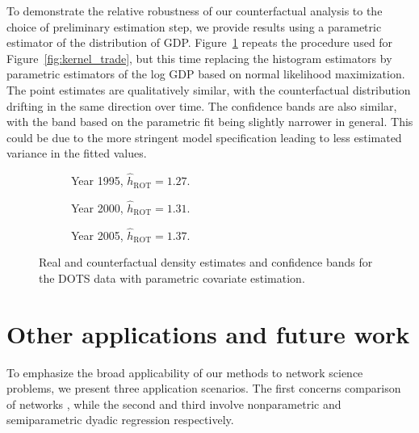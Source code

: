 \documentclass[11pt,lof]{puthesis}
\DeclareMathOperator{\ROT}{ROT}
\theoremstyle{break}
\theoremstyle{proof}
\begin{document}
To demonstrate the relative robustness of our counterfactual analysis to the
choice of preliminary estimation step, we provide results using a
parametric estimator of the distribution of GDP.
Figure~\ref{fig:kernel_trade_para}
repeats the procedure used for Figure~\ref{fig:kernel_trade}, but this time
replacing
the histogram estimators by parametric estimators of the log GDP based on
normal likelihood maximization. The point estimates are qualitatively similar,
with the counterfactual distribution drifting in the same direction over time.
The confidence bands are also similar, with the band based on the parametric
fit being slightly narrower in general. This could be due to the more stringent
model specification leading to less estimated variance in the fitted values.

\begin{figure}[t]
  \centering
  \begin{subfigure}{0.32\textwidth}
    \centering
    \caption{Year 1995, $\hat h_{\ROT} = 1.27$.}
  \end{subfigure}
  \begin{subfigure}{0.32\textwidth}
    \centering
    \caption{Year 2000, $\hat h_{\ROT} = 1.31$.}
  \end{subfigure}
  \begin{subfigure}{0.32\textwidth}
    \centering
    \caption{Year 2005, $\hat h_{\ROT} = 1.37$.}
  \end{subfigure}
  \caption[Parametric likelihood-based estimation and
  inference for the DOTS data]{
    Real and counterfactual density estimates and confidence bands for
  the DOTS data with parametric covariate estimation.}
  \label{fig:kernel_trade_para}
\end{figure}

\section{Other applications and future work}
\label{sec:kernel_future}

To emphasize the broad applicability of our methods to network science
problems, we present three application scenarios. The first concerns comparison
of networks \citep{kolaczyk2009statistical}, while the second and third involve
nonparametric and semiparametric dyadic regression respectively.
\end{document}
